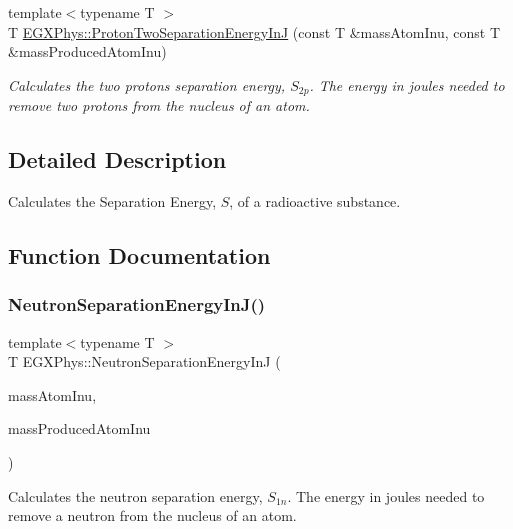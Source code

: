 \begin{DoxyCompactItemize}
{\footnotesize template$<$typename T $>$ }\\T \mbox{\hyperlink{group___e_g_x_phys-_nuclear_separation_energy_gad7c1d4a32daa8aaa53c5fce37c421f82}{E\+G\+X\+Phys\+::\+Proton\+Two\+Separation\+Energy\+InJ}} (const T \&mass\+Atom\+Inu, const T \&mass\+Produced\+Atom\+Inu)
\begin{DoxyCompactList}\small\item\em Calculates the two protons separation energy, $S_{2p}$. The energy in joules needed to remove two protons from the nucleus of an atom. \end{DoxyCompactList}\end{DoxyCompactItemize}


\subsection{Detailed Description}
Calculates the Separation Energy, $S$, of a radioactive substance. 

\subsection{Function Documentation}
\mbox{\label{group___e_g_x_phys-_nuclear_separation_energy_ga14a4bb972ae000ef4ff35f2734ff22d0}} 
\subsubsection{\texorpdfstring{Neutron\+Separation\+Energy\+In\+J()}{NeutronSeparationEnergyInJ()}}
{\footnotesize\ttfamily template$<$typename T $>$ \\
T E\+G\+X\+Phys\+::\+Neutron\+Separation\+Energy\+InJ (\begin{DoxyParamCaption}\item[{const T \&}]{mass\+Atom\+Inu,  }\item[{const T \&}]{mass\+Produced\+Atom\+Inu }\end{DoxyParamCaption})}



Calculates the neutron separation energy, $S_{1n}$. The energy in joules needed to remove a neutron from the nucleus of an atom. 

